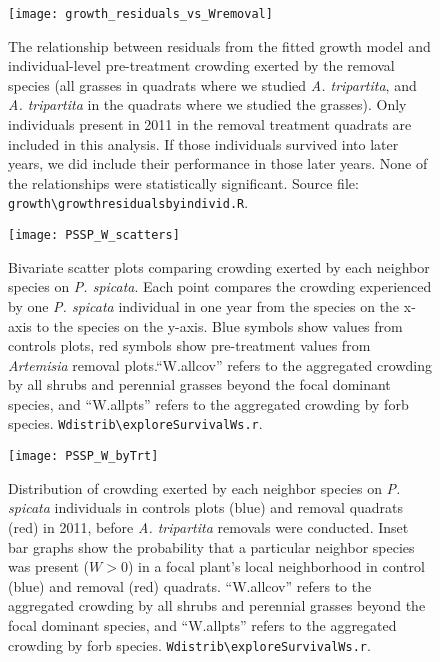 \documentclass[11pt]{article}
\begin{document}
\begin{figure}[h]
\centering
\texttt{[image: growth\_residuals\_vs\_Wremoval]}
\caption{The relationship between residuals from the fitted growth model and individual-level pre-treatment crowding exerted by the removal species (all grasses in quadrats where we studied \textit{A. tripartita}, and \textit{A. tripartita} in the quadrats where we studied the grasses). Only individuals present in 2011 in the removal treatment quadrats are included in this analysis. If those individuals survived into later years, we did include their performance in those later years. None of the relationships were statistically significant. Source file:  \texttt{growth\textbackslash growth\textunderscore residuals\textunderscore by\textunderscore individ.R}.}
\label{fig:GrowthResidsIndivid}
\end{figure}
 
  \begin{figure}[tbp]
  \centering
  \texttt{[image: PSSP\_W\_scatters]}
  \caption{Bivariate scatter plots comparing crowding exerted by each neighbor species on \textit{P. spicata}. Each point compares the crowding experienced by one \textit{P. spicata} individual in one year from the species on the x-axis to the species on the y-axis.   Blue symbols show values from controls plots, red symbols show pre-treatment values from \textit{Artemisia} removal plots.``W.allcov'' refers to the aggregated crowding by all shrubs and perennial grasses beyond the focal dominant species, and ``W.allpts'' refers to the aggregated crowding by forb species.  \texttt{Wdistrib\textbackslash exploreSurvivalWs.r}. }
  \label{fig:Wscatters}
  \end{figure}
  
  \begin{figure}[tbp]
 \centering
 \texttt{[image: PSSP\_W\_byTrt]}
 \caption{Distribution of crowding exerted by each neighbor species on \textit{P. spicata} individuals in controls plots (blue) and removal quadrats (red) in 2011, before \textit{A. tripartita}  removals were conducted. Inset bar graphs show the probability that a particular neighbor species was present ($W>0$) in a focal plant's local neighborhood in control (blue) and removal (red) quadrats. ``W.allcov'' refers to the aggregated crowding by all shrubs and perennial grasses beyond the focal dominant species, and ``W.allpts'' refers to the aggregated crowding by forb species.  \texttt{Wdistrib\textbackslash exploreSurvivalWs.r}. }
 \label{fig:W-by-treatment}
 \end{figure}
 
\end{document}
